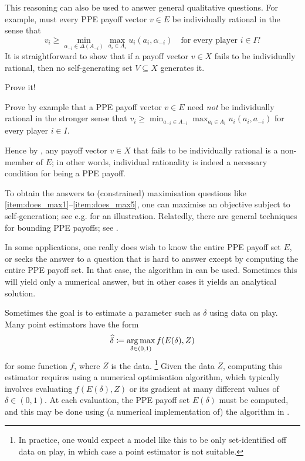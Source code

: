 This reasoning can also be used to answer general qualitative questions. For example, must every PPE payoff vector $v \in E$ be individually rational in the sense that
%
\begin{equation*}
	v_i \geq \min_{\alpha_{-i} \in \Delta(A_{-i})} \max_{a_i \in A_i} u_i(a_i,\alpha_{-i})
	\quad \text{for every player $i \in I$?}
\end{equation*}
%
It is straightforward to show that if a payoff vector $v \in X$ fails to be individually rational, then no self-generating set $V \subseteq X$ generates it.

\begin{exercise}
	\label{exercise:ir_ppe_necessary}
	Prove it!
\end{exercise}

\begin{exercise}
	\label{exercise:ir_ppe_necessary_pure}
	Prove by example that a PPE payoff vector $v \in E$ need \emph{not} be individually rational in the stronger sense that $v_i \geq \min_{a_{-i} \in A_{-i}} \max_{a_i \in A_i} u_i(a_i,a_{-i})$ for every player $i \in I$.
\end{exercise}

\noindent Hence by , any payoff vector $v \in X$ that fails to be individually rational is a non-member of $E$; in other words, individual rationality is indeed a necessary condition for being a PPE payoff.

To obtain the answers to (constrained) maximisation questions like \ref{item:does_max1}--\ref{item:does_max5}, one can maximise an objective subject to self-generation; see e.g. \textcite[section~7.7]{MailathSamuelson2006} for an illustration. Relatedly, there are general techniques for bounding PPE payoffs; see \textcite[][chapter~8]{MailathSamuelson2006}.

In some applications, one really does wish to know the entire PPE payoff set $E$, or seeks the answer to a question that is hard to answer except by computing the entire PPE payoff set. In that case, the algorithm in  can be used. Sometimes this will yield only a numerical answer, but in other cases it yields an analytical solution.

Sometimes the goal is to estimate a parameter such as $\delta$ using data on play. Many point estimators have the form
%
\begin{equation*}
	\widehat{\delta}
	\coloneqq \operatorname*{arg\,max}_{\delta \in (0,1)} f(E(\delta),Z)
\end{equation*}
%
for some function $f$, where $Z$ is the data.%
	\footnote{In practice, one would expect a model like this to be only set-identified off data on play, in which case a point estimator is not suitable.}
Given the data $Z$, computing this estimator requires using a numerical optimisation algorithm, which typically involves evaluating $f(E(\delta),Z)$ or its gradient at many different values of $\delta \in (0,1)$. At each evaluation, the PPE payoff set $E(\delta)$ must be computed, and this may be done using (a numerical implementation of) the algorithm in .

